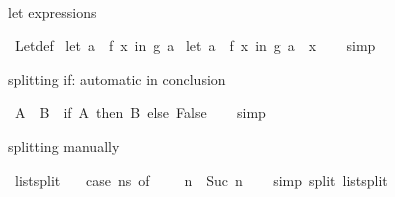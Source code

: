\begin{isabellebody}
\ \ \isamarkupfalse%
%
\endisatagproof
{\isafoldproof}%
%
\isadelimproof
%
\endisadelimproof
%
\begin{isamarkuptext}%
let expressions%
\end{isamarkuptext}\isamarkuptrue%
\isamarkupfalse%
\ Let{\isacharunderscore}{\kern0pt}def\isanewline
{}\isamarkupfalse%
\ {\isachardoublequoteopen}let\ a\ {\isacharequal}{\kern0pt}\ f\ x\ in\ g\ a{\isachardoublequoteclose}\isanewline
\isanewline
{}\isamarkupfalse%
\ {\isachardoublequoteopen}let\ a\ {\isacharequal}{\kern0pt}\ f\ x\ in\ g\ a\ {\isacharequal}{\kern0pt}\ x{\isachardoublequoteclose}\isanewline
%
\isadelimproof
\ \ %
\endisadelimproof
%
\isatagproof
{}\isamarkupfalse%
\ {\isacharparenleft}{\kern0pt}simp{\isacharparenright}{\kern0pt}\isanewline
\ \ \isamarkupfalse%
%
\endisatagproof
{\isafoldproof}%
%
\isadelimproof
%
\endisadelimproof
%
\begin{isamarkuptext}%
splitting if: automatic in conclusion%
\end{isamarkuptext}\isamarkuptrue%
\isamarkupfalse%
\ {\isachardoublequoteopen}{\isacharparenleft}{\kern0pt}A\ {\isasymand}\ B{\isacharparenright}{\kern0pt}\ {\isacharequal}{\kern0pt}\ {\isacharparenleft}{\kern0pt}if\ A\ then\ B\ else\ False{\isacharparenright}{\kern0pt}{\isachardoublequoteclose}\isanewline
%
\isadelimproof
\ \ %
\endisadelimproof
%
\isatagproof
{}\isamarkupfalse%
\ simp%
\endisatagproof
{\isafoldproof}%
%
\isadelimproof
%
\endisadelimproof
%
\begin{isamarkuptext}%
splitting manually%
\end{isamarkuptext}\isamarkuptrue%
\isamarkupfalse%
\ list{\isachardot}{\kern0pt}split\isanewline
\isanewline
{}\isamarkupfalse%
\ {\isachardoublequoteopen}{}\ {\isasymle}\ {\isacharparenleft}{\kern0pt}case\ ns\ of\ {\isacharbrackleft}{\kern0pt}{\isacharbrackright}{\kern0pt}\ {\isasymRightarrow}\ {}\ {\isacharbar}{\kern0pt}\ n{\isacharhash}{\kern0pt}{\isacharunderscore}{\kern0pt}\ {\isasymRightarrow}\ Suc\ n{\isacharparenright}{\kern0pt}{\isachardoublequoteclose}\isanewline
%
\isadelimproof
\ \ %
\endisadelimproof
%
\isatagproof
{}\isamarkupfalse%
\ {\isacharparenleft}{\kern0pt}simp\ split{\isacharcolon}{\kern0pt}\ list{\isachardot}{\kern0pt}split{\isacharparenright}{\kern0pt}%
\endisatagproof
{\isafoldproof}%
%
\isadelimproof
%
\endisadelimproof
%
\begin{isamarkuptext}%

\end{isamarkuptext}
\end{isabellebody}
